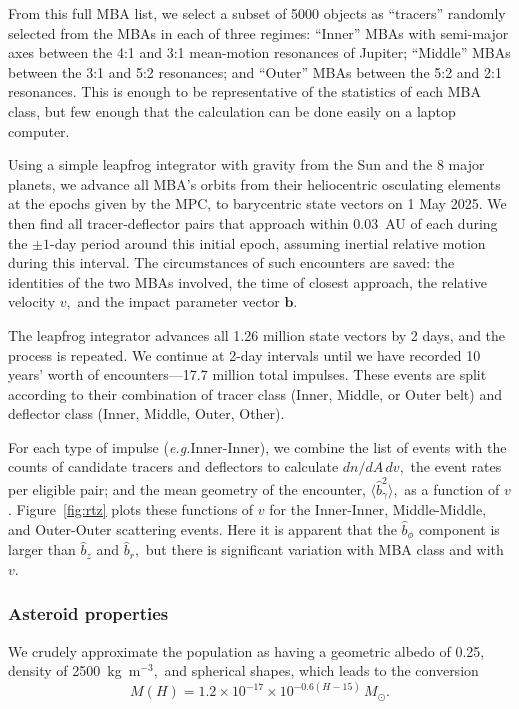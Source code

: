 \documentclass[linenumbers, onecolumn]{aastex631}
\newcommand{\eg}{\textit{e.g.\/}}
\newcommand{\vecb}{\mathbf{b}}
\begin{document}
From this full MBA list, we select a subset of 5000 objects as
``tracers'' randomly selected from the MBAs in each of three regimes:
``Inner'' MBAs with semi-major axes between the 4:1 and 3:1
mean-motion resonances of Jupiter; ``Middle'' MBAs between the 3:1 and
5:2 resonances; and ``Outer'' MBAs between the 5:2 and 2:1
resonances.  This is enough to be representative of the statistics of
each MBA class, but few enough that the calculation can be done easily
on a laptop computer.

Using a simple leapfrog integrator with gravity from the Sun and the 8
major planets, we advance all MBA's orbits from their heliocentric
osculating elements at the epochs given by the MPC, to barycentric
state vectors on 1 May 2025.  We then find all tracer-deflector pairs
that approach within 0.03~AU of each during the $\pm1$-day period
around this initial epoch, assuming inertial relative motion during
this interval.  The circumstances of such encounters are saved: the
identities of the two MBAs involved, the time of closest approach, the
relative velocity $v,$ and the impact parameter vector $\vecb.$

The leapfrog integrator advances all 1.26 million state vectors by 2
days, and the process is repeated.  We continue at 2-day intervals
until we have recorded 10 years' worth of encounters---17.7 million
total impulses.  These events are split according to their combination
of tracer class (Inner, Middle, or Outer belt) and deflector class
(Inner, Middle, Outer, Other).   

For each type of impulse (\eg Inner-Inner), we combine the list of
events with the counts of candidate tracers and deflectors to
calculate $dn/dA\,dv,$ the event rates per eligible pair; and the mean
geometry of the encounter, $\langle \hat b^2_\gamma \rangle,$ as a
function of $v$.  Figure~\ref{fig:rtz} plots these functions of $v$
for the Inner-Inner, Middle-Middle, and Outer-Outer scattering
events.  Here it is apparent that the $\hat b_\phi$ component is
larger than $\hat b_z$ and $\hat b_r,$ but there is significant
variation with MBA class and with $v$.

\subsubsection{Asteroid properties}
We crudely approximate the population as having a geometric albedo of 0.25,
density of 2500~kg~m$^{-3},$ and spherical shapes, which leads to the
conversion
\begin{equation}
  M(H) = 1.2\times10^{-17} \times 10^{-0.6(H-15)}\, M_\odot.
\end{equation}
\end{document}
